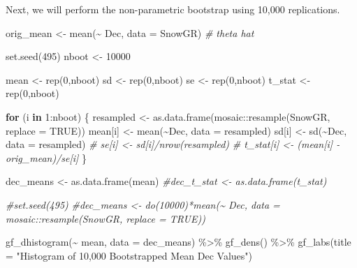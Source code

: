 \documentclass[12pt]{article}
\newenvironment{Shaded}{\begin{snugshade}}{\end{snugshade}}
\newcommand{\AttributeTok}[1]{\textcolor[rgb]{0.77,0.63,0.00}{#1}}
\newcommand{\CommentTok}[1]{\textcolor[rgb]{0.56,0.35,0.01}{\textit{#1}}}
\newcommand{\ConstantTok}[1]{\textcolor[rgb]{0.00,0.00,0.00}{#1}}
\newcommand{\ControlFlowTok}[1]{\textcolor[rgb]{0.13,0.29,0.53}{\textbf{#1}}}
\newcommand{\DecValTok}[1]{\textcolor[rgb]{0.00,0.00,0.81}{#1}}
\newcommand{\FunctionTok}[1]{\textcolor[rgb]{0.00,0.00,0.00}{#1}}
\newcommand{\NormalTok}[1]{#1}
\newcommand{\OtherTok}[1]{\textcolor[rgb]{0.56,0.35,0.01}{#1}}
\newcommand{\SpecialCharTok}[1]{\textcolor[rgb]{0.00,0.00,0.00}{#1}}
\newcommand{\StringTok}[1]{\textcolor[rgb]{0.31,0.60,0.02}{#1}}
\begin{document}
Next, we will perform the non-parametric bootstrap using 10,000
replications.

\begin{Shaded}
\begin{Highlighting}[]
\NormalTok{orig\_mean }\OtherTok{\textless{}{-}} \FunctionTok{mean}\NormalTok{(}\SpecialCharTok{\textasciitilde{}}\NormalTok{ Dec, }\AttributeTok{data =}\NormalTok{ SnowGR) }\CommentTok{\# theta hat}

\FunctionTok{set.seed}\NormalTok{(}\DecValTok{495}\NormalTok{)}
\NormalTok{nboot }\OtherTok{\textless{}{-}} \DecValTok{10000}

\NormalTok{mean }\OtherTok{\textless{}{-}} \FunctionTok{rep}\NormalTok{(}\DecValTok{0}\NormalTok{,nboot)}
\NormalTok{sd }\OtherTok{\textless{}{-}} \FunctionTok{rep}\NormalTok{(}\DecValTok{0}\NormalTok{,nboot)}
\NormalTok{se }\OtherTok{\textless{}{-}} \FunctionTok{rep}\NormalTok{(}\DecValTok{0}\NormalTok{,nboot)}
\NormalTok{t\_stat }\OtherTok{\textless{}{-}} \FunctionTok{rep}\NormalTok{(}\DecValTok{0}\NormalTok{,nboot)}

\ControlFlowTok{for}\NormalTok{ (i }\ControlFlowTok{in} \DecValTok{1}\SpecialCharTok{:}\NormalTok{nboot) \{}
\NormalTok{  resampled }\OtherTok{\textless{}{-}} \FunctionTok{as.data.frame}\NormalTok{(mosaic}\SpecialCharTok{::}\FunctionTok{resample}\NormalTok{(SnowGR, }\AttributeTok{replace =} \ConstantTok{TRUE}\NormalTok{))}
\NormalTok{  mean[i] }\OtherTok{\textless{}{-}} \FunctionTok{mean}\NormalTok{(}\SpecialCharTok{\textasciitilde{}}\NormalTok{Dec, }\AttributeTok{data =}\NormalTok{ resampled)}
\NormalTok{  sd[i] }\OtherTok{\textless{}{-}} \FunctionTok{sd}\NormalTok{(}\SpecialCharTok{\textasciitilde{}}\NormalTok{Dec, }\AttributeTok{data =}\NormalTok{ resampled)}
 \CommentTok{\# se[i] \textless{}{-} sd[i]/nrow(resampled)}
\CommentTok{\#  t\_stat[i] \textless{}{-} (mean[i] {-} orig\_mean)/se[i]}
\NormalTok{\}}

\NormalTok{dec\_means }\OtherTok{\textless{}{-}} \FunctionTok{as.data.frame}\NormalTok{(mean)}
\CommentTok{\#dec\_t\_stat \textless{}{-} as.data.frame(t\_stat)}
\end{Highlighting}
\end{Shaded}

\begin{Shaded}
\begin{Highlighting}[]
\CommentTok{\#set.seed(495)}
\CommentTok{\#dec\_means \textless{}{-} do(10000)*mean(\textasciitilde{} Dec, data = mosaic::resample(SnowGR, replace = TRUE))}


\FunctionTok{gf\_dhistogram}\NormalTok{(}\SpecialCharTok{\textasciitilde{}}\NormalTok{ mean, }\AttributeTok{data =}\NormalTok{ dec\_means) }\SpecialCharTok{\%\textgreater{}\%}
  \FunctionTok{gf\_dens}\NormalTok{() }\SpecialCharTok{\%\textgreater{}\%}
  \FunctionTok{gf\_labs}\NormalTok{(}\AttributeTok{title =} \StringTok{"Histogram of 10,000 Bootstrapped Mean Dec Values"}\NormalTok{)}
\end{Highlighting}
\end{Shaded}
\end{document}
